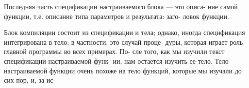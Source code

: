 Последняя часть спецификации настраиваемого блока — это описа-­\linebreak
ние самой функции, т.е. описание типа параметров и результата: заго-­\linebreak
ловок функции.

Блок компиляции состоит из спецификации и тела; однако, иногда\linebreak
спецификация интегрирована в тело; в частности, это случай проце-­\linebreak
дуры, которая играет роль главной программы во всех примерах. По­- \linebreak
сле того, как мы изучили текст спецификации настраиваемой функ­- \linebreak
ии, нам остается изучить ее тело. Тело настраиваемой функции очень\linebreak
похоже на тело функций, которые мы изучали до сих пор, и, за ис-\linebreak
\newpage

